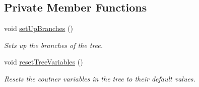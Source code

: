 \subsection*{Private Member Functions}
\begin{DoxyCompactItemize}
\item 
void \hyperlink{class_event_tree_manager_a11cbe0078aeb3d0fe320bbeec335babc}{set\+Up\+Branches} ()
\begin{DoxyCompactList}\small\item\em Sets up the branches of the tree. \end{DoxyCompactList}\item 
void \hyperlink{class_event_tree_manager_a88cf8288ad022053b35192445e77f9a7}{reset\+Tree\+Variables} ()
\begin{DoxyCompactList}\small\item\em Resets the coutner variables in the tree to their default values. \end{DoxyCompactList}\end{DoxyCompactItemize}
